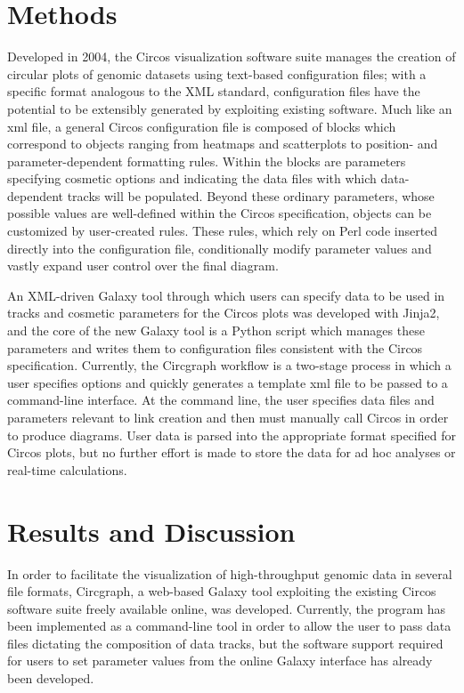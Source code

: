 \documentclass[twocolumn]{article}
\begin{document}
\section*{Methods}
Developed in 2004, the Circos visualization software suite manages the creation of circular plots of genomic datasets using text-based configuration files; with a specific format analogous to the XML standard, configuration files have the potential to be extensibly generated by exploiting existing software. Much like an xml file, a general Circos configuration file is composed of blocks which correspond to objects ranging from heatmaps and scatterplots to position- and parameter-dependent formatting rules. Within the blocks are parameters specifying cosmetic options and indicating the data files with which data-dependent tracks will be populated. Beyond these ordinary parameters, whose possible values are well-defined within the Circos specification, objects can be customized by user-created rules. These rules, which rely on Perl code inserted directly into the configuration file, conditionally modify parameter values and vastly expand user control over the final diagram.  

An XML-driven Galaxy tool through which users can specify data to be used in tracks and cosmetic parameters for the Circos plots was developed with Jinja2, and the core of the new Galaxy tool is a Python script which manages these parameters and writes them to configuration files consistent with the Circos specification. Currently, the Circgraph workflow is a two-stage process in which a user specifies options and quickly generates a template xml file to be passed to a command-line interface. At the command line, the user specifies data files and parameters relevant to link creation and then must manually call Circos in order to produce diagrams. User data is parsed into the appropriate format specified for Circos plots, but no further effort is made to store the data for ad hoc analyses or real-time calculations.

\section*{Results and Discussion}

In order to facilitate the visualization of high-throughput genomic data in several file formats, Circgraph, a web-based Galaxy tool exploiting the existing Circos software suite freely available online, was developed. Currently, the program has been implemented as a command-line tool in order to allow the user to pass data files dictating the composition of data tracks, but the software support required for users to set parameter values from the online Galaxy interface has already been developed.
\end{document}
